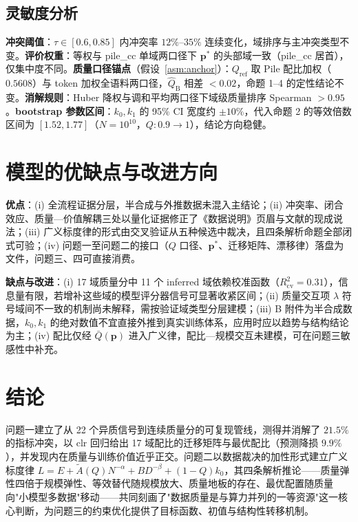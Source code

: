 \subsection{灵敏度分析}

\textbf{冲突阈值}：$\tau\in[0.6,0.85]$ 内冲突率 $12\%$--$35\%$ 连续变化，域排序与主冲突类型不变。\textbf{评价权重}：等权与 pile\_cc 单域两口径下 $\bm p^*$ 的头部域一致（pile\_cc 居首），仅集中度不同。\textbf{质量口径锚点}（假设~\ref{asm:anchor}）：$Q_{\mathrm{ref}}$ 取 Pile 配比加权（$0.5608$）与 token 加权全语料两口径，$\hat Q_{\mathrm B}$ 相差 $<0.02$，命题 1--4 的定性结论不变。\textbf{消解规则}：Huber 降权与调和平均两口径下域级质量排序 Spearman $>0.95$。\textbf{bootstrap 参数区间}：$k_0,k_1$ 的 95\% CI 宽度约 $\pm10\%$，代入命题 2 的等效倍数区间为 $[1.52,1.77]$（$N=10^{10}$，$Q:0.9\to1$），结论方向稳健。

\section{模型的优缺点与改进方向}

\textbf{优点}：(i) 全流程证据分层，半合成与外推数据未混入主结论；(ii) 冲突率、闭合效应、质量—价值解耦三处以量化证据修正了《数据说明》页眉与文献的现成说法；(iii) 广义标度律的形式由交叉验证从五种候选中裁决，且四条解析命题全部闭式可验；(iv) 问题一至问题二的接口（$Q$ 口径、$\bm p^*$、迁移矩阵、漂移律）落盘为文件，问题三、四可直接消费。

\textbf{缺点与改进}：(i) 17 域质量分中 11 个 inferred 域依赖校准函数（$R^2_{\mathrm{cv}}=0.31$），信息量有限，若增补这些域的模型评分器信号可显著收紧区间；(ii) 质量交互项 $\lambda$ 符号域间不一致的机制尚未解释，需按验证域类型分层建模；(iii) B 附件为半合成数据，$k_0,k_1$ 的绝对数值不宜直接外推到真实训练体系，应用时应以趋势与结构结论为主；(iv) 配比仅经 $\bar Q(\bm p)$ 进入广义律，配比—规模交互未建模，可在问题三敏感性中补充。

\section{结论}

问题一建立了从 22 个异质信号到连续质量分的可复现管线，测得并消解了 $21.5\%$ 的指标冲突，以 clr 回归给出 17 域配比的迁移矩阵与最优配比（预测降损 $9.9\%$），并发现内在质量与训练价值近乎正交。问题二以数据裁决的加性形式建立广义标度律 $L=E+\widetilde A(Q)N^{-\alpha}+BD^{-\beta}+(1-Q)k_0$，其四条解析推论——质量弹性四倍于规模弹性、等效替代随规模放大、质量地板的存在、最优配置随质量向"小模型多数据"移动——共同刻画了"数据质量是与算力并列的一等资源"这一核心判断，为问题三的约束优化提供了目标函数、初值与结构性转移机制。

